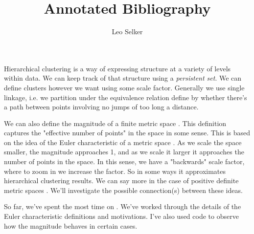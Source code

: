 \documentclass[]{article}
\title{Annotated Bibliography}
\author{Leo Selker}
\begin{document}
\maketitle
Hierarchical clustering is a way of expressing structure at a variety of levels within data. We can keep track of that structure using a \textit{persistent set}\cite{Carl1}. We can define clusters however we want using some scale factor. Generally we use single linkage, i.e. we partition under the equivalence relation define by whether there's a path between points involving no jumps of too long a distance.

We can also define the magnitude of a finite metric space \cite{Lein2}. This definition captures the "effective number of points" in the space in some sense. This is based on the idea of the Euler characteristic of a metric space \cite{Lein1}. As we scale the space smaller, the magnitude approaches 1, and as we scale it larger it approaches the number of points in the space. In this sense, we have a "backwards" scale factor, where to zoom in we increase the factor. So in some ways it approximates hierarchical clustering results. We can say more in the case of positive definite metric spaces \cite{Meck1}. We'll investigate the possible connection(s) between these ideas.

So far, we've spent the most time on \cite{Lein1}. We've worked through the details of the Euler characteristic definitions and motivations. I've also used code to observe how the magnitude behaves in certain cases.





{}

\end{document}
